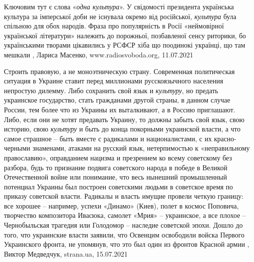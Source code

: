 Ключовим тут є слова «\emph{одна культура}». У свідомості президента українська
культура за імперської доби не існувала окремо від російської, \emph{культура} була
спільною для обох народів. Фраза про популярність в Росії «неймовірної
української літератури» належить до порожньої, позбавленої сенсу риторики, бо
українськими творами цікавились у РСФСР хіба що поодинокі українці, що там
мешкали
, 
Лариса Масенко, www.radiosvoboda.org, 11.07.2021

Строить правовую, а не моноэтническую страну.  Современная политическая
ситуация в Украине ставит перед миллионами русскоязычного населения непростую
дилемму. Либо сохранить свой язык и \emph{культуру}, но предать украинское
государство, стать гражданами другой страны, в данном случае России, тем более
что из Украины их выталкивают, а в Россию приглашают. Либо, если они не хотят
предавать Украину, то должны забыть свой язык, свою историю, свою \emph{культуру} и
быть до конца покорными украинской власти, а что самое страшное – быть вместе с
радикалами и националистами, с их красно-черными знаменами, атаками на русский
язык, нетерпимостью к «неправильному православию», оправданием нацизма и
презрением ко всему советскому без разбора, будь то признание подвига
советского народа в победе в Великой Отечественной войне или понимание, что
весь нынешний промышленный потенциал Украины был построен советскими людьми в
советское время по приказу советской власти. Радикалы и власть имущие провели
четкую границу: все хорошее – например, успехи «Динамо» (Киев), полет в космос
Поповича, творчество композитора Ивасюка, самолет «Мрия» – украинское, а все
плохое – Чернобыльская трагедия или Голодомор – наследие советской эпохи. Дошло
до того, что украинские власти заявили, что Освенцим освободили войска Первого
Украинского фронта, не упомянув, что это был один из фронтов Красной армии
, 
Виктор Медведчук, strana.ua, 15.07.2021

